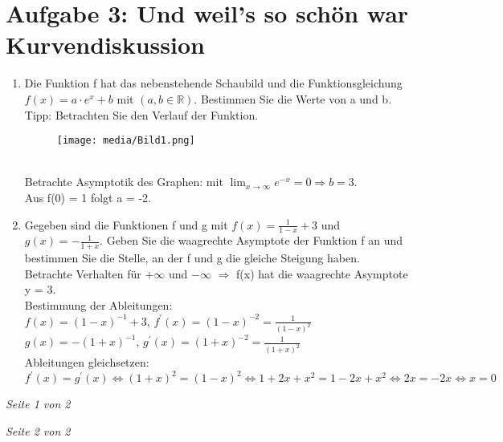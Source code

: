 \documentclass[11pt,a4paper, parskip=half ]{report}
\begin{document}
\section*{Aufgabe 3: Und weil's so schön war Kurvendiskussion}
\begin{enumerate}
  \item Die Funktion f  hat das nebenstehende Schaubild und die	Funktionsgleichung $f(x) = a\cdot e^x + b$ mit $(a,b \in \mathbb{R})$. Bestimmen Sie die Werte von a und b. Tipp: Betrachten Sie den Verlauf der Funktion.
  \begin{figure}
    \texttt{[image: media/Bild1.png]}
  \end{figure}
  \vspace{20pt}
  \\Betrachte Asymptotik des Graphen: mit $\lim_{x\rightarrow\infty} e^{-x} = 0 \Rightarrow b = 3$.
  \\Aus f(0) = 1 folgt a = -2.	
  \item Gegeben sind die Funktionen f und g mit $f(x) = \frac{1}{1-x}+3$ und $g(x)=-\frac{1}{1+x}$.	Geben Sie die waagrechte Asymptote der Funktion f an und bestimmen Sie die Stelle, an der f und g  die gleiche Steigung haben.
  \vspace{20pt}
  \\Betrachte Verhalten für $+\infty$ und $-\infty$ $\Rightarrow$ f(x) hat die waagrechte Asymptote y = 3.
  \\Bestimmung der Ableitungen:	
  \\$f(x) = (1-x)^{-1}+3$, $f^{\prime}(x) = (1-x)^{-2} = \frac{1}{(1-x)^2}$ 
  \\$g(x) = -(1+x)^{-1}$, $g^{\prime}(x) = (1+x)^{-2} = \frac{1}{(1+x)^2}$      
  \\Ableitungen gleichsetzen:
  \\$f^{\prime}(x) = g^{\prime}(x)   \Leftrightarrow 	(1+x)^2 = (1-x)^2 \Leftrightarrow 1+2x+x^2 = 1-2x+x^2 \Leftrightarrow 2x = -2x \Leftrightarrow x = 0$	

\end{enumerate}
 
\vfill
\begin{flushright}\textit{Seite 1 von 2}\end{flushright}\newpage



\vfill
\begin{flushright}\textit{Seite 2 von 2}\end{flushright}%
\end{document}
